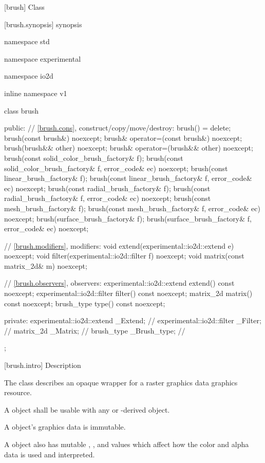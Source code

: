  [brush] {Class }

 [brush.synopsis] { synopsis}

\begin{codeblock}
namespace std { namespace experimental { namespace io2d { inline namespace v1 {
  class brush {
  public:
    // \ref{brush.cons}, construct/copy/move/destroy:
    brush() = delete;
    brush(const brush&) noexcept;
    brush& operator=(const brush&) noexcept;
    brush(brush&& other) noexcept;
    brush& operator=(brush&& other) noexcept;
    brush(const solid_color_brush_factory& f);
    brush(const solid_color_brush_factory& f, error_code& ec) noexcept;
    brush(const linear_brush_factory& f);
    brush(const linear_brush_factory& f, error_code& ec) noexcept;
    brush(const radial_brush_factory& f);
    brush(const radial_brush_factory& f, error_code& ec) noexcept;
    brush(const mesh_brush_factory& f);
    brush(const mesh_brush_factory& f, error_code& ec) noexcept;
    brush(surface_brush_factory& f);
    brush(surface_brush_factory& f, error_code& ec) noexcept;

    // \ref{brush.modifiers}, modifiers:
    void extend(experimental::io2d::extend e) noexcept;
    void filter(experimental::io2d::filter f) noexcept;
    void matrix(const matrix_2d& m) noexcept;

    // \ref{brush.observers}, observers:
    experimental::io2d::extend extend() const noexcept;
    experimental::io2d::filter filter() const noexcept;
    matrix_2d matrix() const noexcept;
    brush_type type() const noexcept;

  private:
    experimental::io2d::extend _Extend; // \expos
    experimental::io2d::filter _Filter; // \expos
    matrix_2d _Matrix;                         // \expos
    brush_type _Brush_type;                    // \expos
  };
} } } }
\end{codeblock}

 [brush.intro] { Description}

\pnum
{}
The class  describes an opaque wrapper for a raster graphics data graphics resource.

\pnum
A  object shall be usable with any  or -derived object.

\pnum
A  object's graphics data is immutable.

\pnum
A  object also has mutable , , and  values which affect how the color and alpha data is used and interpreted.

